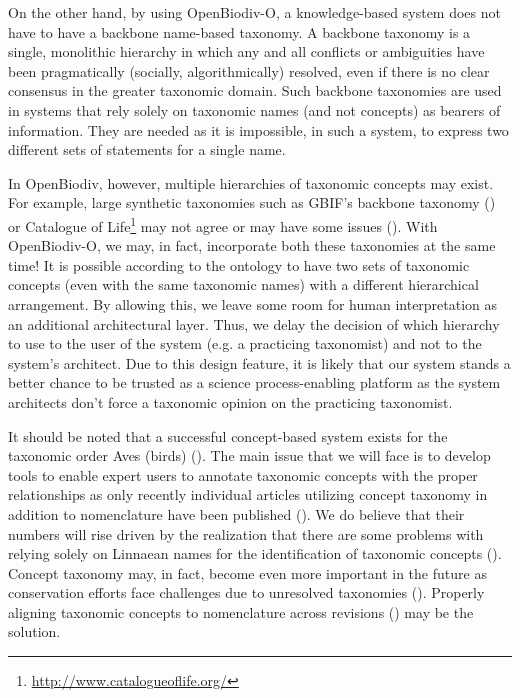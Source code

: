 On the other hand, by using \mbox{OpenBiodiv-O}, a knowledge-based system does not have to have a backbone name-based taxonomy. A backbone taxonomy is a single, monolithic hierarchy in which any and all conflicts or ambiguities have been pragmatically (socially, algorithmically) resolved, even if there is no clear consensus in the greater taxonomic domain. Such backbone taxonomies are used in systems that rely solely on taxonomic names (and not concepts) as bearers of information. They are needed as it is impossible, in such a system, to express two different sets of statements for a single name.

In OpenBiodiv, however, multiple hierarchies of taxonomic concepts may exist. For example, large synthetic taxonomies such as GBIF's backbone taxonomy (\cite{gbif_secretariat_gbif_2017}) or Catalogue of Life\footnote{\href{http://www.catalogueoflife.org/}{http://www.catalogueoflife.org/}} may not agree or may have some issues (\cite{page_gbif_2012}). With OpenBiodiv-O, we may, in fact, incorporate both these taxonomies at the same time! It is possible according to the ontology to have two sets of taxonomic concepts (even with the same taxonomic names) with a different hierarchical arrangement. By allowing this, we leave some room for human interpretation as an additional architectural layer. Thus, we delay the decision of which hierarchy to use to the user of the system (e.g. a practicing taxonomist) and not to the system's architect. Due to this design feature, it is likely that our system stands a better chance to be trusted as a science process-enabling platform as the system architects don't force a taxonomic opinion on the practicing taxonomist.

It should be noted that a successful concept-based system exists for the taxonomic order Aves (birds) (\cite{lepage_avibase_2014}). The main issue that we will face is to develop tools to enable expert users to annotate taxonomic concepts with the proper relationships as only recently individual articles utilizing concept taxonomy in addition to nomenclature have been published (\cite{franz_two_2016,jansen_phylogenetic_2015,franz_three_2017}). We do believe that their numbers will rise driven by the realization that there are some problems with relying solely on Linnaean names for the identification of taxonomic concepts (\cite{patterson_names_2010,remsen_use_2016, franz_names_2016}). Concept taxonomy may, in fact, become even more important in the future as conservation efforts face challenges due to unresolved taxonomies (\cite{garnett_taxonomy_2017}). Properly aligning taxonomic concepts to nomenclature across revisions (\cite{franz_logic_2016-1}) may be the solution.

